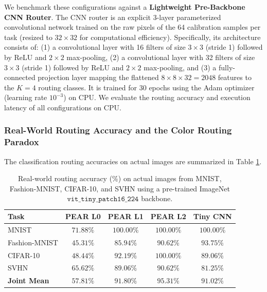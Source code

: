 We benchmark these configurations against a \textbf{Lightweight Pre-Backbone CNN Router}. The CNN router is an explicit 3-layer parameterized convolutional network trained on the raw pixels of the 64 calibration samples per task (resized to $32 \times 32$ for computational efficiency). Specifically, its architecture consists of: (1) a convolutional layer with 16 filters of size $3 \times 3$ (stride 1) followed by ReLU and $2 \times 2$ max-pooling, (2) a convolutional layer with 32 filters of size $3 \times 3$ (stride 1) followed by ReLU and $2 \times 2$ max-pooling, and (3) a fully-connected projection layer mapping the flattened $8 \times 8 \times 32 = 2048$ features to the $K=4$ routing classes. It is trained for 30 epochs using the Adam optimizer (learning rate $10^{-3}$) on CPU. We evaluate the routing accuracy and execution latency of all configurations on CPU.

\subsubsection{Real-World Routing Accuracy and the Color Routing Paradox}
The classification routing accuracies on actual images are summarized in Table \ref{tab:real_world_accuracy}.

\begin{table}[h]
\caption{Real-world routing accuracy (\%) on actual images from MNIST, Fashion-MNIST, CIFAR-10, and SVHN using a pre-trained ImageNet $\mathtt{vit\_tiny\_patch16\_224}$ backbone.}
\label{tab:real_world_accuracy}
\vskip 0.15in
\begin{center}
\begin{scriptsize}
\begin{sc}
\setlength{\tabcolsep}{3pt}
\begin{tabular}{lcccc}
\toprule
Task & PEAR L0 & PEAR L1 & PEAR L2 & Tiny CNN \\
\midrule
MNIST & $71.88\%$ & $100.00\%$ & $100.00\%$ & $100.00\%$ \\
Fashion-MNIST & $45.31\%$ & $85.94\%$ & $90.62\%$ & $93.75\%$ \\
CIFAR-10 & $48.44\%$ & $92.19\%$ & $100.00\%$ & $89.06\%$ \\
SVHN & $65.62\%$ & $89.06\%$ & $90.62\%$ & $81.25\%$ \\
\midrule
\textbf{Joint Mean} & $\mathbf{57.81\%}$ & $\mathbf{91.80\%}$ & $\mathbf{95.31\%}$ & $\mathbf{91.02\%}$ \\
\bottomrule
\end{tabular}
\end{sc}
\end{scriptsize}
\end{center}
\vskip -0.1in
\end{table}


